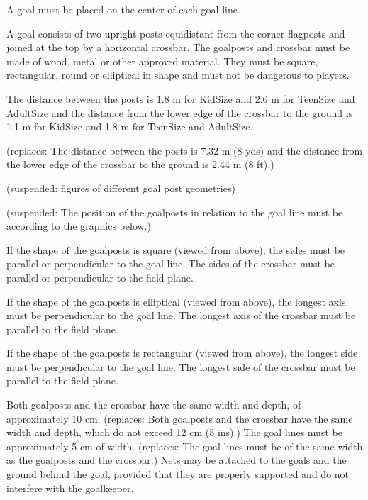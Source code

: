 \headlinebox

A goal must be placed on the center of each goal line.


\bigskip

A goal consists of two upright posts equidistant from the corner flagposts and joined at the top by a horizontal crossbar. The goalposts and crossbar must be made of wood, metal or other approved material. They must be square, rectangular, round or elliptical in shape and must
not be dangerous to players.

\bigskip

The distance between the posts is 1.8 m for KidSize and 2.6 m for TeenSize and AdultSize and the distance from the lower edge of the crossbar to the ground is 1.1 m for KidSize and 1.8 m for TeenSize and AdultSize. 

{\color[rgb]{0.4,0.4,0.4}
(replaces: The distance between the posts is 7.32 m (8 yds) and the distance from the lower edge of the crossbar to the ground is 2.44 m (8 ft).)}

\bigskip

{\color[rgb]{0.4,0.4,0.4}
(suspended: figures of different goal post geometries)}

\bigskip

{\color[rgb]{0.4,0.4,0.4}
(suspended: The position of the goalposts in relation to the goal line must be according to the graphics below.)}

\bigskip

If the shape of the goalposts is square (viewed from above), the sides must be parallel or perpendicular to the goal line. The sides of the crossbar must be parallel or perpendicular to the field plane.

\bigskip

If the shape of the goalposts is elliptical (viewed from above), the longest axis must be perpendicular to the goal line. The longest axis of the crossbar must be parallel to the field plane.

\bigskip

If the shape of the goalposts is rectangular (viewed from above), the longest side must be perpendicular to the goal line. The longest side of the crossbar must be parallel to the field plane.

\bigskip

Both goalposts and the crossbar have the same width and depth, of approximately 10 cm. 
\textcolor[rgb]{0.4,0.4,0.4}{
(replaces: Both
goalposts and the crossbar have the same width and depth, which do not exceed 12 cm (5 ins).)} 
The goal lines must be approximately 5 cm of width. 
\textcolor[rgb]{0.4,0.4,0.4}{
(replaces: The goal lines must be of the same width as the goalposts and the crossbar.)} 
Nets may be attached to the goals and the ground behind the goal, provided that they are properly supported and do not interfere with the goalkeeper.

